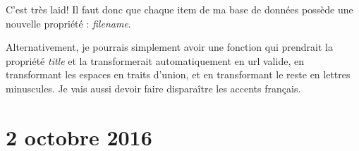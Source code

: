 C'est très laid! Il faut donc que chaque item de ma base de données possède une nouvelle propriété : \textit{filename}.

Alternativement, je pourrais simplement avoir une fonction qui prendrait la propriété \textit{title} et la transformerait automatiquement en url valide, en transformant les espaces en traits d'union, et en transformant le reste en lettres minuscules. Je vais aussi devoir faire disparaître les accents français.

\section{2 octobre 2016}

